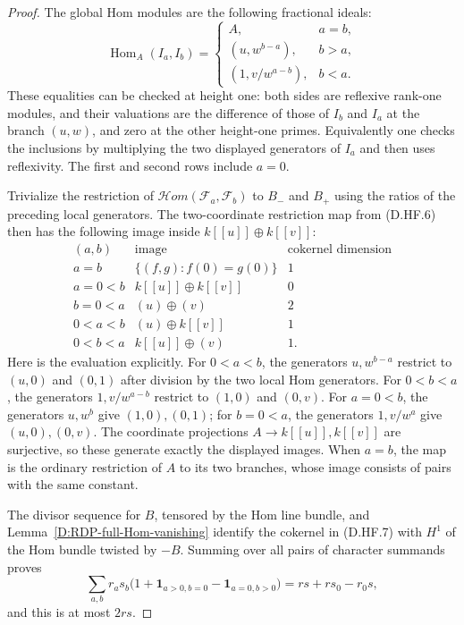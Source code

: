 \begin{proof}
The global Hom modules are the following fractional ideals:
\[
 \operatorname{Hom}_A(I_a,I_b)=
 \begin{cases}
 A,&a=b,\\
 (u,w^{b-a}),&b>a,\\
 (1,v/w^{a-b}),&b<a.
 \end{cases}                                           \tag{D.HF.6}
\]
These equalities can be checked at height one: both sides are
reflexive rank-one modules, and their valuations are the difference
of those of $I_b$ and $I_a$ at the branch $(u,w)$, and zero at the
other height-one primes. Equivalently one checks the inclusions
by multiplying the two displayed generators of $I_a$ and then
uses reflexivity. The first and second rows include $a=0$.

Trivialize the restriction of $\mathcal Hom(\mathcal F_a,\mathcal F_b)$
to $B_-$ and $B_+$ using the ratios of the preceding local generators.
The two-coordinate restriction map from (D.HF.6) then has the
following image inside $k[[u]]\oplus k[[v]]$:
\[
\begin{array}{c|c|c}
 (a,b)&\text{image}&\text{cokernel dimension}\\ \hline
 a=b&\{(f,g):f(0)=g(0)\}&1\\
 a=0<b&k[[u]]\oplus k[[v]]&0\\
 b=0<a&(u)\oplus(v)&2\\
 0<a<b&(u)\oplus k[[v]]&1\\
 0<b<a&k[[u]]\oplus(v)&1.
\end{array}                                             \tag{D.HF.7}
\]
Here is the evaluation explicitly. For $0<a<b$, the generators
$u,w^{b-a}$ restrict to $(u,0)$ and $(0,1)$ after division by the
two local Hom generators. For $0<b<a$, the generators
$1,v/w^{a-b}$ restrict to $(1,0)$ and $(0,v)$.
For $a=0<b$, the generators $u,w^b$ give $(1,0),(0,1)$;
for $b=0<a$, the generators $1,v/w^a$ give $(u,0),(0,v)$.
The coordinate projections $A\to k[[u]],k[[v]]$ are surjective,
so these generate exactly the displayed images.
When $a=b$, the map is the ordinary restriction of $A$ to its
two branches, whose image consists of pairs with the same constant.

The divisor sequence for $B$, tensored by the Hom line bundle,
and Lemma~\ref{D:RDP-full-Hom-vanishing} identify the cokernel in
(D.HF.7) with $H^1$ of the Hom bundle twisted by $-B$.
Summing over all pairs of character summands proves
\[
 \sum_{a,b}r_a s_b\bigl(1+\mathbf1_{a>0,b=0}
                              -\mathbf1_{a=0,b>0}\bigr)
            =rs+r s_0-r_0s,
\]
and this is at most $2rs$.
\end{proof}

